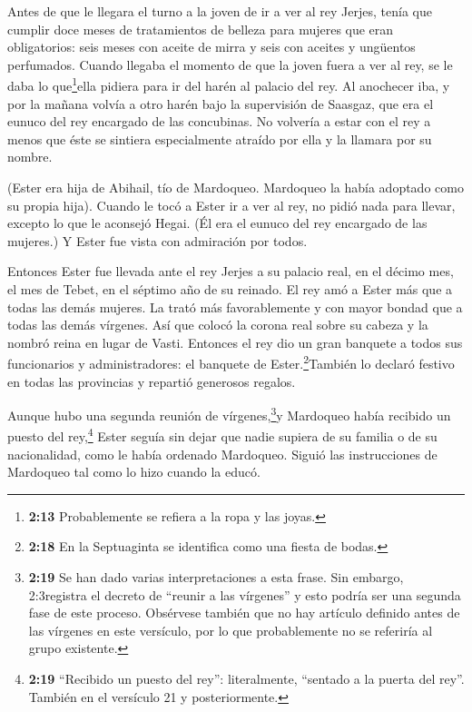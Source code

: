  Antes de que le llegara el turno a la joven de ir a ver al
rey Jerjes, tenía que cumplir doce meses de tratamientos de belleza para
mujeres que eran obligatorios: seis meses con aceite de mirra y seis con
aceites y ungüentos perfumados.  Cuando llegaba el momento
de que la joven fuera a ver al rey, se le daba lo que\footnote{\textbf{2:13}
  Probablemente se refiera a la ropa y las joyas.}ella pidiera para ir
del harén al palacio del rey.  Al anochecer iba, y por la
mañana volvía a otro harén bajo la supervisión de Saasgaz, que era el
eunuco del rey encargado de las concubinas. No volvería a estar con el
rey a menos que éste se sintiera especialmente atraído por ella y la
llamara por su nombre.

 (Ester era hija de Abihail, tío de Mardoqueo. Mardoqueo la
había adoptado como su propia hija). Cuando le tocó a Ester ir a ver al
rey, no pidió nada para llevar, excepto lo que le aconsejó Hegai. (Él
era el eunuco del rey encargado de las mujeres.) Y Ester fue vista con
admiración por todos.

 Entonces Ester fue llevada ante el rey Jerjes a su palacio
real, en el décimo mes, el mes de Tebet, en el séptimo año de su
reinado.  El rey amó a Ester más que a todas las demás
mujeres. La trató más favorablemente y con mayor bondad que a todas las
demás vírgenes. Así que colocó la corona real sobre su cabeza y la
nombró reina en lugar de Vasti.  Entonces el rey dio un
gran banquete a todos sus funcionarios y administradores: el banquete de
Ester.\footnote{\textbf{2:18} En la Septuaginta se identifica como una
  fiesta de bodas.}También lo declaró festivo en todas las provincias y
repartió generosos regalos.

 Aunque hubo una segunda reunión de vírgenes,\footnote{\textbf{2:19}
  Se han dado varias interpretaciones a esta frase. Sin embargo,
  2:3registra el decreto de ``reunir a las vírgenes'' y esto podría ser
  una segunda fase de este proceso. Obsérvese también que no hay
  artículo definido antes de las vírgenes en este versículo, por lo que
  probablemente no se referiría al grupo existente.}y Mardoqueo había
recibido un puesto del rey,\footnote{\textbf{2:19} ``Recibido un puesto
  del rey'': literalmente, ``sentado a la puerta del rey''. También en
  el versículo 21 y posteriormente.}  Ester seguía sin
dejar que nadie supiera de su familia o de su nacionalidad, como le
había ordenado Mardoqueo. Siguió las instrucciones de Mardoqueo tal como
lo hizo cuando la educó.

